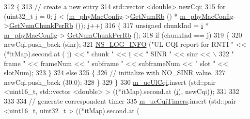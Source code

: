 \begin{DoxyCode}
312               \{
313                 \textcolor{comment}{// create a new entry}
314                 std::vector <double> newCqi;
315                 \textcolor{keywordflow}{for} (uint32\_t j = 0; j < (\hyperlink{classns3_1_1MmWaveMacScheduler_a24d7af4971d2e500fe543cefbafa2fd9}{m\_phyMacConfig}->\hyperlink{classns3_1_1MmWavePhyMacCommon_a4c5f323fd722d6eec52efda5d76f97ad}{GetNumRb} () * 
      \hyperlink{classns3_1_1MmWaveMacScheduler_a24d7af4971d2e500fe543cefbafa2fd9}{m\_phyMacConfig}->\hyperlink{classns3_1_1MmWavePhyMacCommon_a8a303f463053dadea5902859a00d481f}{GetNumChunkPerRb} ()); j++)
316                   \{
317                                 \textcolor{keywordtype}{unsigned} chunkInd = \hyperlink{bernuolliDistribution_8m_a6f6ccfcf58b31cb6412107d9d5281426}{i} * \hyperlink{classns3_1_1MmWaveMacScheduler_a24d7af4971d2e500fe543cefbafa2fd9}{m\_phyMacConfig}->
      \hyperlink{classns3_1_1MmWavePhyMacCommon_a8a303f463053dadea5902859a00d481f}{GetNumChunkPerRb} ();
318                     \textcolor{keywordflow}{if} (chunkInd == j)
319                       \{
320                         newCqi.push\_back (sinr);
321                         \hyperlink{group__logging_gafbd73ee2cf9f26b319f49086d8e860fb}{NS\_LOG\_INFO} (\textcolor{stringliteral}{"UL CQI report for RNTI "} << (*itMap).second.at (
      \hyperlink{bernuolliDistribution_8m_a6f6ccfcf58b31cb6412107d9d5281426}{i}) << \textcolor{stringliteral}{" chunk "} << \hyperlink{bernuolliDistribution_8m_a6f6ccfcf58b31cb6412107d9d5281426}{i} << \textcolor{stringliteral}{" SINR "} << sinr << \(\backslash\)
322                                       \textcolor{stringliteral}{" frame "} << frameNum << \textcolor{stringliteral}{" subframe "} << subframeNum << \textcolor{stringliteral}{" slot "} << 
      slotNum);
323                       \}
324                     \textcolor{keywordflow}{else}
325                       \{
326                         \textcolor{comment}{// initialize with NO\_SINR value.}
327                         newCqi.push\_back (30.0);
328                       \}
329                   \}
330                 \hyperlink{classns3_1_1MmWaveRrMacScheduler_aeb890d54a9f369fe677a64efa78d2402}{m\_ueUlCqi}.insert (std::pair <uint16\_t, std::vector <double> > ((*itMap).second.at 
      (\hyperlink{bernuolliDistribution_8m_a6f6ccfcf58b31cb6412107d9d5281426}{i}), newCqi));
331 
332 
333 
334                 \textcolor{comment}{// generate correspondent timer}
335                 \hyperlink{classns3_1_1MmWaveRrMacScheduler_a48957bee7e937b6d8627194fa429a473}{m\_ueCqiTimers}.insert (std::pair <uint16\_t, uint32\_t > ((*itMap).second.at (

\end{DoxyCode}
